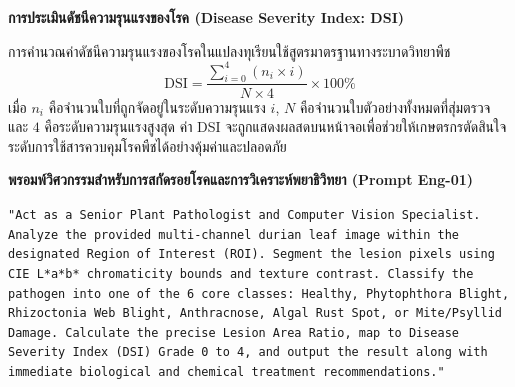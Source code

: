 \begin{theorybox}
\textbf{การประเมินดัชนีความรุนแรงของโรค (Disease Severity Index: DSI)}\par
การคำนวณค่าดัชนีความรุนแรงของโรคในแปลงทุเรียนใช้สูตรมาตรฐานทางระบาดวิทยาพืช
\begin{equation}
  \text{DSI} = \frac{\sum_{i=0}^{4} (n_i \times i)}{N \times 4} \times 100\%
\end{equation}
เมื่อ $n_i$ คือจำนวนใบที่ถูกจัดอยู่ในระดับความรุนแรง $i$, $N$ คือจำนวนใบตัวอย่างทั้งหมดที่สุ่มตรวจ และ $4$ คือระดับความรุนแรงสูงสุด ค่า DSI จะถูกแสดงผลสดบนหน้าจอเพื่อช่วยให้เกษตรกรตัดสินใจระดับการใช้สารควบคุมโรคพืชได้อย่างคุ้มค่าและปลอดภัย
\end{theorybox}

\begin{promptbox}
\textbf{พรอมพ์วิศวกรรมสำหรับการสกัดรอยโรคและการวิเคราะห์พยาธิวิทยา (Prompt Eng-01)}\par
\texttt{"Act as a Senior Plant Pathologist and Computer Vision Specialist. Analyze the provided multi-channel durian leaf image within the designated Region of Interest (ROI). Segment the lesion pixels using CIE L*a*b* chromaticity bounds and texture contrast. Classify the pathogen into one of the 6 core classes: Healthy, Phytophthora Blight, Rhizoctonia Web Blight, Anthracnose, Algal Rust Spot, or Mite/Psyllid Damage. Calculate the precise Lesion Area Ratio, map to Disease Severity Index (DSI) Grade 0 to 4, and output the result along with immediate biological and chemical treatment recommendations."}
\end{promptbox}
